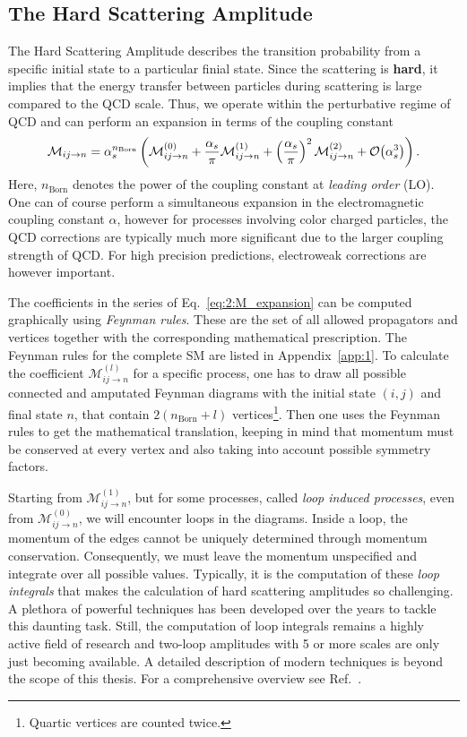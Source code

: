 \subsection{The Hard Scattering Amplitude}
The Hard Scattering Amplitude describes the transition probability from a specific initial state to a particular finial state. Since the scattering is \textbf{hard}, it implies that the energy transfer between particles during scattering is large compared to the QCD scale. Thus, we operate within the perturbative regime of QCD and can perform an expansion in terms of the coupling constant
\begin{equation}
\mathcal{M}_{ij \rightarrow n} = \alpha_s^{n_\text{Born}} \left( \mathcal{M}_{ij \rightarrow n}^{(0)} + \frac{\alpha_s}{\pi} \mathcal{M}_{ij \rightarrow n}^{(1)} + \left(\frac{\alpha_s}{\pi}\right)^2 \mathcal{M}_{ij \rightarrow n}^{(2)} + \mathcal{O}\!\left(\alpha_s^3\right) \right).
\label{eq:2:M_expansion}
\end{equation}
Here, $n_\text{Born}$ denotes the power of the coupling constant at \textit{leading order} (\acs{LO}). One can of course perform a simultaneous expansion in the electromagnetic coupling constant $\alpha$, however for processes involving color charged particles, the \acs{QCD} corrections are typically much more significant due to the larger coupling strength of \acs{QCD}. For high precision predictions, electroweak corrections are however important.

The coefficients in the series of Eq.~\eqref{eq:2:M_expansion} can be computed graphically using \textit{Feynman rules}. These are the set of all allowed propagators and vertices together with the corresponding mathematical prescription. The Feynman rules for the complete \acs{SM} are listed in Appendix~\ref{app:1}. To calculate the coefficient $\mathcal{M}_{ij \rightarrow n}^{(l)}$ for a specific process, one has to draw all possible connected and amputated Feynman diagrams with the initial state $(i,j)$ and final state $n$, that contain $2(n_\text{Born} + l)$ vertices\footnote{Quartic vertices are counted twice.}. Then one uses the Feynman rules to get the mathematical translation, keeping in mind that momentum must be conserved at every vertex and also taking into account possible symmetry factors.

Starting from $\mathcal{M}^{(1)}_{ij \rightarrow n}$, but for some processes, called \textit{loop induced processes}, even from $\mathcal{M}^{(0)}_{ij \rightarrow n}$, we will encounter loops in the diagrams. Inside a loop, the momentum of the edges cannot be uniquely determined through momentum conservation. Consequently, we must leave the momentum unspecified and integrate over all possible values. Typically, it is the computation of these \textit{loop integrals} that makes the calculation of hard scattering amplitudes so challenging. A plethora of powerful techniques has been developed over the years to tackle this daunting task. Still, the computation of loop integrals remains a highly active field of research and two-loop amplitudes with 5 or more scales are only just becoming available. A detailed description of modern techniques is beyond the scope of this thesis. For a comprehensive overview see Ref.~\cite{Weinzierl:2022eaz}.

